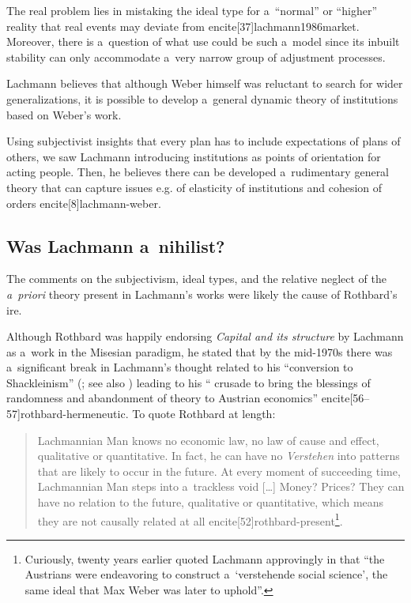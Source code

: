 {The real problem lies in mistaking the ideal type for a~``normal'' or ``higher'' reality that real events may deviate from encite[37]{lachmann1986market}. Moreover, there is a~question of what use could be such a~model since its inbuilt stability can only accommodate a~very narrow group of adjustment processes.



Lachmann believes that although Weber himself was reluctant to search for wider generalizations, it is possible to develop a~general dynamic theory of institutions based on Weber's work.

Using subjectivist insights that every plan has to include expectations of plans of others, we saw Lachmann introducing institutions as points of orientation for acting people. Then, he believes there can be developed a~rudimentary general theory that can capture issues e.g. of elasticity of institutions and cohesion of orders encite[8]{lachmann-weber}.



\subsection{Was Lachmann a~nihilist?}





The comments on the subjectivism, ideal types, and the relative neglect of the \emph{a~priori} theory present in Lachmann's works were likely the cause of Rothbard's ire.

Although Rothbard was happily endorsing \emph{Capital and its structure} by Lachmann as a~work in the Misesian paradigm, he stated that by the mid-1970s there was a~significant break in Lachmann's thought related to his ``conversion to Shackleinism'' (\cite[53]{rothbard-present}; see also \cite{barbieri2021lachmann}) leading to his `` crusade to bring the blessings of randomness and abandonment of theory to Austrian economics'' encite[56--57]{rothbard-hermeneutic}. To quote Rothbard at length:

\begin{quote}

Lachmannian Man knows no economic law, no law of cause and effect, qualitative or quantitative. In fact, he can have no \emph{Verstehen} into patterns that are likely to occur in the future. At every moment of succeeding time, Lachmannian Man steps into a~trackless void [\ldots] Money? Prices? They can have no relation to the future, qualitative or quantitative, which means they are not causally related at all encite[52]{rothbard-present}\footnote{Curiously, twenty years earlier \textcite[50]{rothbard-praxeology-method} quoted Lachmann approvingly in that ``the Austrians were endeavoring to construct a~`verstehende social science', the same ideal that Max Weber was later to uphold''.}.


\end{quote}}
